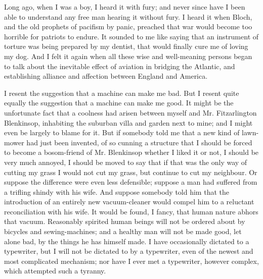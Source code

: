 \documentclass{book}
\begin{document}
Long ago, when I was a boy, I heard it with fury; and never since have I been able to understand any free man hearing it without fury. I heard it when Bloch, and the old prophets of pacifism by panic, preached that war would become too horrible for patriots to endure. It sounded to me like saying that an instrument of torture was being prepared by my dentist, that would finally cure me of loving my dog. And I felt it again when all these wise and well-meaning persons began to talk about the inevitable effect of aviation in bridging the Atlantic, and establishing alliance and affection between England and America.

I resent the suggestion that a machine can make me bad. But I resent quite equally the suggestion that a machine can make me good. It might be the unfortunate fact that a coolness had arisen between myself and Mr. Fitzarlington Blenkinsop, inhabiting the suburban villa and garden next to mine; and I might even be largely to blame for it. But if somebody told me that a new kind of lawn-mower had just been invented, of so cunning a structure that I should be forced to become a bosom-friend of Mr. Blenkinsop whether I liked it or not, I should be very much annoyed, I should be moved to say that if that was the only way of cutting my grass I would not cut my grass, but continue to cut my neighbour. Or suppose the difference were even less defensible; suppose a man had suffered from a trifling shindy with his wife. And suppose somebody told him that the introduction of an entirely new vacuum-cleaner would compel him to a reluctant reconciliation with his wife. It would be found, I fancy, that human nature abhors that vacuum. Reasonably spirited human beings will not be ordered about by bicycles and sewing-machines; and a healthy man will not be made good, let alone bad, by the things he has himself made. I have occasionally dictated to a typewriter, but I will not be dictated to by a typewriter, even of the newest and most complicated mechanism; nor have I ever met a typewriter, however complex, which attempted such a tyranny.
\end{document}
